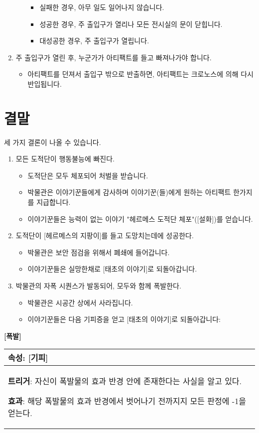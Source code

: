 \documentclass[12pt]{report}
\newenvironment{story}[2]
{\begin{center}
		{\large \textbf{[#1]}}\\[1ex]
		\begin{tabular}{|p{\textwidth}|}
			\hline
			\textbf{속성}: #2
			\\
			\hline
		}
		{
			\\\hline
		\end{tabular}
	\end{center}
}
\begin{document}
\begin{enumerate}
\begin{itemize}
\begin{itemize}
					\item 실패한 경우, 아무 일도 일어나지 않습니다.
					\item 성공한 경우, 주 출입구가 열리나 모든 전시실의 문이 닫힙니다.
					\item 대성공한 경우, 주 출입구가 열립니다.
				\end{itemize}
			\end{itemize}
			\item 주 출입구가 열린 후, 누군가가 아티팩트를 들고 빠져나가야 합니다.
			\begin{itemize}
				\item 아티팩트를 던져서 출입구 밖으로 반출하면, 아티팩트는 크로노스에 의해 다시 반입됩니다.
			\end{itemize}
		\end{enumerate}
		
	\section*{결말}
		세 가지 결론이 나올 수 있습니다.
		\begin{enumerate}
			\item 모든 도적단이 행동불능에 빠진다.
			\begin{itemize}
				\item 도적단은 모두 체포되어 처벌을 받습니다.
				\item 박물관은 이야기꾼들에게 감사하며 이야기꾼(들)에게 원하는 아티팩트 한가지를 지급합니다.
				\item 이야기꾼들은 능력이 없는 이야기 "헤르메스 도적단 체포"([설화])를 얻습니다.
			\end{itemize}
		
			\item 도적단이 [헤르메스의 지팡이]를 들고 도망치는데에 성공한다.
				\begin{itemize}
					\item 박물관은 보안 점검을 위해서 폐쇄에 들어갑니다.
					\item 이야기꾼들은 실망한채로 [태초의 이야기]로 되돌아갑니다.
				\end{itemize}
		
			\item 박물관의 자폭 시퀀스가 발동되어, 모두와 함께 폭발한다.
				\begin{itemize}
					\item 박물관은 시공간 상에서 사라집니다.
					\item 이야기꾼들은 다음 기피증을 얻고 [태초의 이야기]로 되돌아갑니다:
				\end{itemize}
		\end{enumerate}
		\begin{story}{폭발}{[기피]}
			\textbf{트리거}: 자신이 폭발물의 효과 반경 안에 존재한다는 사실을 알고 있다.
			
			\textbf{효과}: 해당 폭발물의 효과 반경에서 벗어나기 전까지지 모든 판정에 -1을 얻는다.
		\end{story}
			
\end{document}
